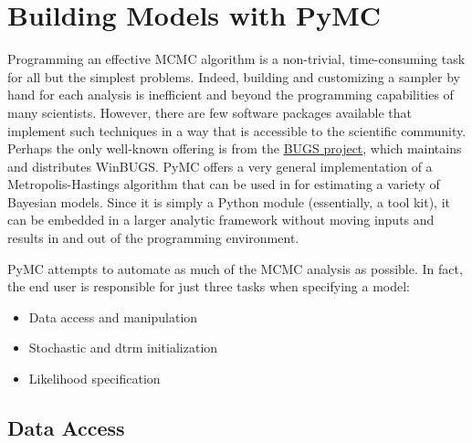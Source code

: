 \documentclass[]{book}
\begin{document}
\chapter{Building Models with PyMC}

Programming an effective MCMC algorithm is a non-trivial, time-consuming task for all but the simplest problems. Indeed, building and customizing a sampler by hand for each analysis is inefficient and beyond the programming capabilities of many scientists. However, there are few software packages available that implement such techniques in a way that is accessible to the scientific community. Perhaps the only well-known offering is from the \href{http://www.mrc-bsu.cam.ac.uk/bugs/}{BUGS project}, which maintains and distributes WinBUGS. PyMC offers a very general implementation of a Metropolis-Hastings algorithm that can be used in for estimating a variety of Bayesian models. Since it is simply a Python module (essentially, a tool kit), it can be embedded in a larger analytic framework without moving inputs and results in and out of the programming environment.

PyMC attempts to automate as much of the MCMC analysis as possible. In fact, the end user is responsible for just three tasks when specifying a model:
\begin{itemize}

    \item Data access and manipulation

    \item Stochastic and dtrm initialization

    \item Likelihood specification

\end{itemize}

\section{Data Access}\label{sec:data_access}
\end{document}

